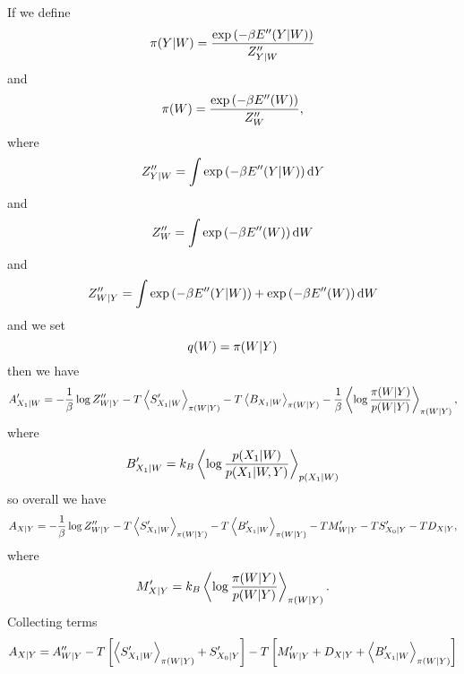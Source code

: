 \documentclass[]{article}
\begin{document}
If we define 
\[
\pi(Y | W) = \frac{\exp\left(-\beta E^{\prime\prime}(Y |W)\right)}{Z^{\prime\prime}_{Y | W}}
\] 
and 
\[
\pi(W) = \frac{\exp\left(-\beta E^{\prime\prime}(W)\right)}{Z^{\prime\prime}_{W}},
\] 
where 
\[
Z^{\prime\prime}_{Y | W} = \int \exp\left(-\beta E^{\prime\prime}(Y |W)\right) \text{d}Y
\] 
and 
\[
Z^{\prime\prime}_{W} = \int \exp\left(-\beta E^{\prime\prime}(W)\right) \text{d}W
\] 
and 
\[
Z^{\prime\prime}_{W|Y} = \int \exp\left(-\beta E^{\prime\prime}(Y |W)\right)  + \exp\left(-\beta E^{\prime\prime}(W)\right) \text{d}W
\] 
and we set 
\[
q(W) = \pi(W |Y)
\] 
then we have 
\[
A^\prime_{X_1|W} = -\frac{1}{\beta} \log  Z^{\prime\prime}_{W|Y} - T\left\langle S^\prime_{X_1 | W} \right\rangle_{\pi(W | Y)} - T\left\langle B_{X_1 | W} \right\rangle_{\pi(W | Y)}  - \frac{1}{\beta}\left\langle \log\frac{\pi(W|Y)}{p(W|Y)} \right\rangle_{\pi(W|Y)},
\] 
where 
\[
B^\prime_{X_1 | W} = k_B \left\langle \log\frac{p(X_1 | W)}{p(X_1| W , Y)} \right\rangle_{p(X_1 | W)}
\] 
so overall we have 
\[
A_{X|Y} = -\frac{1}{\beta} \log  Z^{\prime\prime}_{W|Y} - T\left\langle S^\prime_{X_1 | W} \right\rangle_{\pi(W | Y)} - T\left\langle B^\prime_{X_1 | W} \right\rangle_{\pi(W | Y)}  - TM^\prime_{W|Y} - TS^\prime_{X_0|Y}- TD_{X|Y},
\] 
where 
\[
M^\prime_{X|Y} =  k_B\left\langle \log\frac{\pi(W|Y)}{p(W|Y)} \right\rangle_{\pi(W|Y)}.
\] 
Collecting terms 
\[
A_{X|Y} = A^{\prime\prime}_{W|Y} - T\left[\left\langle S^\prime_{X_1 | W} \right\rangle_{\pi(W | Y)} + S^\prime_{X_0|Y}\right]   - T\left[M^\prime_{W|Y} + D_{X|Y} + \left\langle B^\prime_{X_1 | W} \right\rangle_{\pi(W | Y)}\right]
\] 
\end{document}
